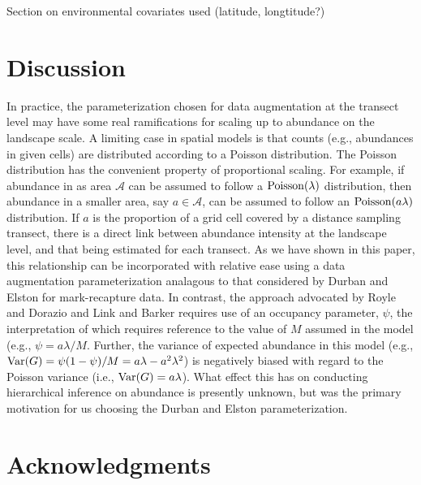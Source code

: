 \documentclass[10pt]{article}
\begin{document}
Section on environmental covariates used (latitude, longtitude?)


\section*{Discussion}

In practice, the parameterization chosen for data augmentation at the transect level may have some real ramifications for scaling up to abundance on the landscape scale.  A limiting case in spatial models is that counts (e.g., abundances in given cells) are distributed according to a Poisson distribution.  The Poisson distribution has the convenient property of proportional scaling.  For example, if abundance in as area $\mathcal{A}$  can be assumed to follow a ${\rm Poisson}(\lambda)$ distribution, then abundance in a smaller area, say $a \in \mathcal{A}$, can be assumed to follow an ${\rm Poisson}(a\lambda)$ distribution.  If $a$ is the proportion of a grid cell covered by a distance sampling transect, there is a direct link between abundance intensity at the landscape level, and that being estimated for each transect.  As we have shown in this paper, this relationship can be incorporated with relative ease using a data augmentation parameterization analagous to that considered by Durban and Elston \cite{DurbanElston2005} for mark-recapture data. In contrast, the approach advocated by Royle and Dorazio \cite{RoyleDorazio2008} and Link and Barker \cite{LinkBarker2010} requires use of an occupancy parameter, $\psi$, the interpretation of which requires reference to the value of $M$ assumed in the model (e.g., $\psi=a\lambda/M$.  Further, the variance of expected abundance in this model (e.g., ${\rm Var}(G)=\psi (1-\psi)/M = a\lambda-a^2\lambda^2$) is negatively biased with regard to the Poisson variance (i.e., ${\rm Var}(G)=a\lambda$).  What effect this has on conducting hierarchical inference on abundance is presently unknown, but was the primary motivation for us choosing the Durban and Elston \cite{DurbanElston2005} parameterization.


\section*{Acknowledgments}



\clearpage
\end{document}
